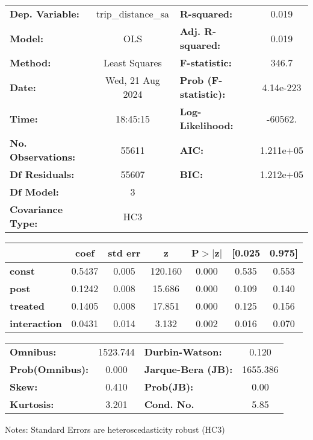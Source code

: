 \begin{center}
\begin{tabular}{lclc}
\toprule
\textbf{Dep. Variable:}    & trip\_distance\_sa & \textbf{  R-squared:         } &     0.019   \\
\textbf{Model:}            &        OLS         & \textbf{  Adj. R-squared:    } &     0.019   \\
\textbf{Method:}           &   Least Squares    & \textbf{  F-statistic:       } &     346.7   \\
\textbf{Date:}             &  Wed, 21 Aug 2024  & \textbf{  Prob (F-statistic):} & 4.14e-223   \\
\textbf{Time:}             &      18:45:15      & \textbf{  Log-Likelihood:    } &   -60562.   \\
\textbf{No. Observations:} &        55611       & \textbf{  AIC:               } & 1.211e+05   \\
\textbf{Df Residuals:}     &        55607       & \textbf{  BIC:               } & 1.212e+05   \\
\textbf{Df Model:}         &            3       & \textbf{                     } &             \\
\textbf{Covariance Type:}  &        HC3         & \textbf{                     } &             \\
\bottomrule
\end{tabular}
\begin{tabular}{lcccccc}
                     & \textbf{coef} & \textbf{std err} & \textbf{z} & \textbf{P$> |$z$|$} & \textbf{[0.025} & \textbf{0.975]}  \\
\midrule
\textbf{const}       &       0.5437  &        0.005     &   120.160  &         0.000        &        0.535    &        0.553     \\
\textbf{post}        &       0.1242  &        0.008     &    15.686  &         0.000        &        0.109    &        0.140     \\
\textbf{treated}     &       0.1405  &        0.008     &    17.851  &         0.000        &        0.125    &        0.156     \\
\textbf{interaction} &       0.0431  &        0.014     &     3.132  &         0.002        &        0.016    &        0.070     \\
\bottomrule
\end{tabular}
\begin{tabular}{lclc}
\textbf{Omnibus:}       & 1523.744 & \textbf{  Durbin-Watson:     } &    0.120  \\
\textbf{Prob(Omnibus):} &   0.000  & \textbf{  Jarque-Bera (JB):  } & 1655.386  \\
\textbf{Skew:}          &   0.410  & \textbf{  Prob(JB):          } &     0.00  \\
\textbf{Kurtosis:}      &   3.201  & \textbf{  Cond. No.          } &     5.85  \\
\bottomrule
\end{tabular}
\end{center}

Notes: \newline
 [1] Standard Errors are heteroscedasticity robust (HC3)
